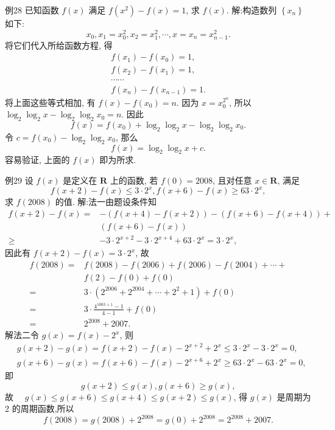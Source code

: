 例28 已知函数 $f(x)$ 满足 $f\left(x^2\right)-f(x)=1$, 求 $f(x)$.
解:构造数列 $\left\{x_n\right\}$ 如下:
$$
x_0, x_1=x_0^2, x_2=x_1^2, \cdots, x=x_n=x_{n-1}^2 .
$$
将它们代入所给函数方程, 得
$$
\begin{gathered}
f\left(x_1\right)-f\left(x_0\right)=1, \\
f\left(x_2\right)-f\left(x_1\right)=1, \\
\cdots \cdots \\
f\left(x_n\right)-f\left(x_{n-1}\right)=1 .
\end{gathered}
$$
将上面这些等式相加, 有 $f(x)-f\left(x_0\right)=n$.
因为 $x=x_0^{2^n}$, 所以 $\log _2 \log _2 x-\log _2 \log _2 x_0=n$. 因此
$$
f(x)=f\left(x_0\right)+\log _2 \log _2 x-\log _2 \log _2 x_0 .
$$
令 $c=f\left(x_0\right)-\log _2 \log _2 x_0$, 那么
$$
f(x)=\log _2 \log _2 x+c .
$$
容易验证, 上面的 $f(x)$ 即为所求.



例29 设 $f(x)$ 是定义在 $\mathbf{R}$ 上的函数, 若 $f(0)=2008$, 且对任意 $x \in \mathbf{R}$, 满足
$$
f(x+2)-f(x) \leqslant 3 \cdot 2^x, f(x+6)-f(x) \geqslant 63 \cdot 2^x,
$$
求 $f(2008)$ 的值.
解:法一由题设条件知
$$
\begin{aligned}
f(x+2)-f(x)= & -(f(x+4)-f(x+2))-(f(x+6)-f(x+4))+ \\
& (f(x+6)-f(x)) \\
\geqslant & -3 \cdot 2^{x+2}-3 \cdot 2^{x+4}+63 \cdot 2^x=3 \cdot 2^x,
\end{aligned}
$$
因此有 $f(x+2)-f(x)=3 \cdot 2^x$, 故
$$
\begin{aligned}
f(2008)= & f(2008)-f(2006)+f(2006)-f(2004)+\cdots+ \\
& f(2)-f(0)+f(0) \\
= & 3 \cdot\left(2^{2006}+2^{2004}+\cdots+2^2+1\right)+f(0) \\
= & 3 \cdot \frac{4^{1003+1}-1}{4-1}+f(0) \\
= & 2^{2008}+2007 .
\end{aligned}
$$
解法二令 $g(x)=f(x)-2^x$, 则
$$
\begin{aligned}
& g(x+2)-g(x)=f(x+2)-f(x)-2^{x+2}+2^x \leqslant 3 \cdot 2^x-3 \cdot 2^x=0, \\
& g(x+6)-g(x)=f(x+6)-f(x)-2^{x+6}+2^x \geqslant 63 \cdot 2^x-63 \cdot 2^x=0,
\end{aligned}
$$
即
$$
g(x+2) \leqslant g(x), g(x+6) \geqslant g(x),
$$
故 $\quad g(x) \leqslant g(x+6) \leqslant g(x+4) \leqslant g(x+2) \leqslant g(x)$,
得 $g(x)$ 是周期为 2 的周期函数,所以
$$
f(2008)=g(2008)+2^{2008}=g(0)+2^{2008}=2^{2008}+2007 .
$$



